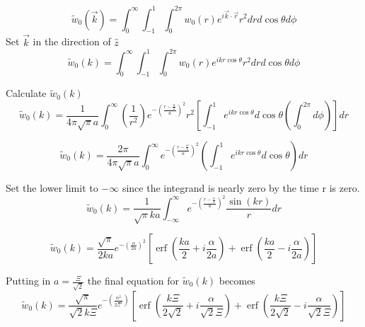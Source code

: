 \documentclass[double,12pt]{beavtex}
\begin{document}
\begin{equation}{\widetilde{w}_0(\vec{k})=\int_{0}^{\infty}\int_{-1}^{1}\int_{0}^{2\pi}w_0(r)e^{i\vec{k}\cdot{\vec{r}}}r^2d{r}d{\cos\theta}d{\phi}}\end{equation}
Set $\vec{k}$ in the direction of $\hat{z}$ 
\begin{equation}{\widetilde{w}_0(k)=\int_{0}^{\infty}\int_{-1}^{1}\int_{0}^{2\pi}w_0(r)e^{ikr\cos\theta}r^2d{r}d{\cos\theta}d{\phi}}\end{equation}

Calculate $\widetilde{w}_0(k)$ 
\begin{equation}{\widetilde{w}_0(k)=\frac{1}{4{\pi}\sqrt{\pi}a}\int_{0}^{\infty}\left(\frac{1}{r^2}\right)e^{-\left(\frac{r-\frac{\alpha}{2}}{a}\right)^2}r^2\left[\int_{-1}^{1}e^{ikr\cos\theta}d{\cos\theta}\left(\int_{0}^{2\pi}d{\phi}\right)\right]d{r}}\end{equation}

\begin{equation}{\widetilde{w}_0(k)=\frac{2\pi}{4{\pi}\sqrt{\pi}a}\int_{0}^{\infty}e^{-\left(\frac{r-\frac{\alpha}{2}}{a}\right)^2}\left(\int_{-1}^{1}e^{ikr\cos\theta}d{\cos\theta}\right)d{r}}\end{equation}

Set the lower limit to $-\infty$  since the integrand is nearly zero by the time r is zero. 
\begin{equation}{\widetilde{w}_0(k)=\frac{1}{\sqrt{\pi}ka}\int_{-\infty}^{\infty}e^{-\left(\frac{r-\frac{\alpha}{2}}{a}\right)^2}\frac{\sin(kr)}{r}d{r}}\end{equation}

\begin{equation}{\widetilde{w}_0(k)=\frac{\sqrt{\pi}}{2ka}e^{-\left(\frac{\alpha}{2a}\right)^2}\left[\operatorname{erf}\left(\frac{ka}{2}+i\frac{\alpha}{2a}\right)+\operatorname{erf}\left(\frac{ka}{2}-i\frac{\alpha}{2a}\right)\right]}\end{equation}
 
Putting in $a=\frac{\Xi}{\sqrt{2}}$ the final equation for $\widetilde{w}_0(k)$ becomes
\begin{equation}{\widetilde{w}_0(k)=\frac{\sqrt{\pi}}{\sqrt{2}k\Xi}e^{-\left(\frac{\alpha^2}{2\Xi^2}\right)}\left[\operatorname{erf}\left(\frac{k\Xi}{2\sqrt{2}}+i\frac{\alpha}{\sqrt{2}\Xi}\right)+\operatorname{erf}\left(\frac{k\Xi}{2\sqrt{2}}-i\frac{\alpha}{\sqrt{2}\Xi}\right)\right]}\end{equation}
\end{document}
